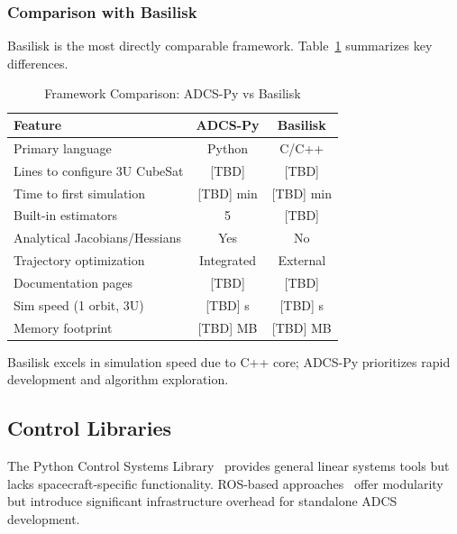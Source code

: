 \documentclass[conference]{IEEEtran}
\begin{document}
\subsubsection{Comparison with Basilisk}
Basilisk is the most directly comparable framework. Table~\ref{tab:basilisk_comparison} summarizes key differences.

\begin{table}[t]
    \centering
    \caption{Framework Comparison: ADCS-Py vs Basilisk}
    \label{tab:basilisk_comparison}
    \begin{tabular}{lcc}
        \toprule
        Feature & ADCS-Py & Basilisk \\
        \midrule
        Primary language & Python & C/C++ \\
        Lines to configure 3U CubeSat & [TBD] & [TBD] \\
        Time to first simulation & [TBD] min & [TBD] min \\
        Built-in estimators & 5 & [TBD] \\
        Analytical Jacobians/Hessians & Yes & No \\
        Trajectory optimization & Integrated & External \\
        Documentation pages & [TBD] & [TBD] \\
        \midrule
        Sim speed (1 orbit, 3U) & [TBD] s & [TBD] s \\
        Memory footprint & [TBD] MB & [TBD] MB \\
        \bottomrule
    \end{tabular}
    \begin{flushleft}
    \small Basilisk excels in simulation speed due to C++ core; ADCS-Py prioritizes rapid development and algorithm exploration.
    \end{flushleft}
\end{table}


\subsection{Control Libraries}\label{subsec:related_control}

The Python Control Systems Library~\cite{python_control} provides general linear systems tools but lacks spacecraft-specific functionality. ROS-based approaches~\cite{ros} offer modularity but introduce significant infrastructure overhead for standalone ADCS development.
\end{document}
